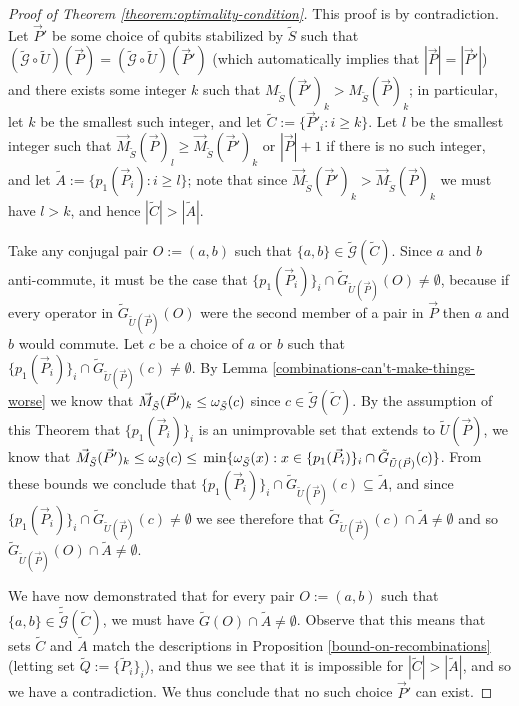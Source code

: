 \documentclass[twocolumn,showpacs,preprintnumbers,amsmath,amssymb,nofootinbib,pra,floatfix]{revtex4-1}
\newcommand{\lst}{\vec}
\newcommand{\set}{\tilde}
\newcommand{\genfun}{\tilde{\mathcal{G}}}
\begin{document}
\begin{proof}[Proof of Theorem \ref{theorem:optimality-condition}]
This proof is by contradiction.  Let $\lst P'$ be some choice of qubits stabilized by $\set S$ such that $(\genfun\circ\set U)(\lst P)=(\genfun\circ\set U)(\lst P')$ (which automatically implies that $|\lst P|=|\lst P'|$) and there exists some integer $k$ such that $M_{\set S}(\lst P')_k > M_{\set S}(\lst P)_k$;  in particular, let $k$ be the smallest such integer, and let $\set C:=\{\lst P'_i : i \ge k\}$.  Let $l$ be the smallest integer such that $\lst M_{\set S}(\lst P)_l\ge \lst M_{\set S}(\lst P')_k$ or $|\lst P|+1$ if there is no such integer, and let $\set A := \{p_1(\lst P_i) : i \ge l\}$; note that since $\lst M_{\set S}(\lst P')_k > \lst M_{\set S}(\lst P)_k$ we must have $l>k$, and hence $|\set C| > |\set A|$.

Take any conjugal pair $O:=(a,b)$ such that $\{a,b\}\in\genfun(\set C)$.  Since $a$ and $b$ anti-commute, it must be the case that $\{p_1(\lst P_i)\}_i\cap \set G_{\set U(\lst P)}(O)\ne\emptyset$, because if every operator in $\set G_{\set U(\lst P)}(O)$ were the second member of a pair in $\lst P$ then $a$ and $b$ would commute.  Let $c$ be a choice of $a$ or $b$ such that $\{p_1(\lst P_i)\}_i\cap \set G_{\set U(\lst P)}(c)\ne\emptyset$.  By Lemma \ref{combinations-can't-make-things-worse} we know that $\lst M_{\set S}(\lst P')_k\le\om_{\set S}(c)$ since $c\in\genfun(\set C)$.  By the assumption of this Theorem that $\{p_1(\lst P_i)\}_i$ is an unimprovable set that extends to $\set U(\lst P)$, we know that $\lst M_{\set S}(\lst P')_k \le \om_{\set S}(c)\le\min \{\om_{\set S}(x):x\in\{p_1(\lst P_i)\}_i\cap \set G_{\set U(\lst P)}(c)\}$.  From these bounds we conclude that $\{p_1(\lst P_i)\}_i\cap \set G_{\set U(\lst P)}(c)\subseteq \set A$, and since $\{p_1(\lst P_i)\}_i\cap \set G_{\set U(\lst P)}(c)\ne\emptyset$ we see therefore that $\set G_{\set U(\lst P)}(c)\cap\set A\ne\emptyset$ and so $\set G_{\set U(\lst P)}(O)\cap\set A\ne\emptyset$.

We have now demonstrated that for every pair $O:=(a,b)$ such that $\{a,b\}\in\set \genfun(\set C)$, we must have $\set G(O)\cap\set A \ne\emptyset$.  Observe that this means that sets $\set C$ and $\set A$ match the descriptions in Proposition \ref{bound-on-recombinations} (letting set $\set Q:=\{\set P_i\}_i$), and thus we see that it is impossible for $|\set C|>|\set A|$, and so we have a contradiction.  We thus conclude that no such choice $\lst P'$ can exist.
\end{proof}
\end{document}
